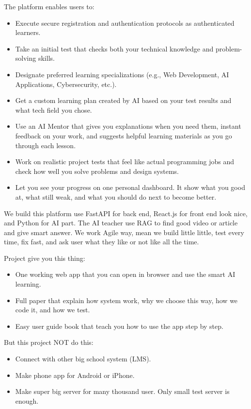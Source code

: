 \documentclass{FastFyp}
\begin{document}
The platform enables users to:
\begin{itemize}
    \item Execute secure registration and authentication protocols as authenticated learners.
    \item Take an initial test that checks both your technical knowledge and problem-solving skills.
    \item Designate preferred learning specializations (e.g., Web Development, AI Applications, Cybersecurity, etc.).
    \item Get a custom learning plan created by AI based on your test results and what tech field you chose.
    \item Use an AI Mentor that gives you explanations when you need them, instant feedback on your work, and suggests helpful learning materials as you go through each lesson.
    \item Work on realistic project tests that feel like actual programming jobs and check how well you solve problems and design systems.
    \item Let you see your progress on one personal dashboard. It show what you good at, what still weak, and what you should do next to become better.

  \end{itemize}

We build this platform use FastAPI for back end, React.js for front end look nice, and Python for AI part. The AI teacher use RAG to find good video or article and give smart answer. We work Agile way, mean we build little little, test every time, fix fast, and ask user what they like or not like all the time.

Project give you this thing:
\begin{itemize}
    \item One working web app that you can open in browser and use the smart AI learning.
    \item Full paper that explain how system work, why we choose this way, how we code it, and how we test.
    \item Easy user guide book that teach you how to use the app step by step.
\end{itemize}

But this project NOT do this:
\begin{itemize}
    \item Connect with other big school system (LMS).
    \item Make phone app for Android or iPhone.
    \item Make super big server for many thousand user. Only small test server is enough.
\end{itemize}
\end{document}
